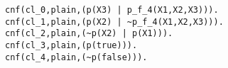 \begin{lstlisting}[label=tptpex]
cnf(cl_0,plain,(p(X3) | p_f_4(X1,X2,X3))).
cnf(cl_1,plain,(p(X2) | ~p_f_4(X1,X2,X3))).
cnf(cl_2,plain,(~p(X2) | p(X1))).
cnf(cl_3,plain,(p(true))).
cnf(cl_4,plain,(~p(false))).
\end{lstlisting}
